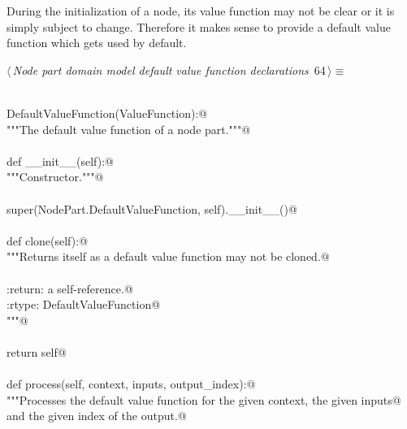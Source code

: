 \documentclass[
    a4paper,      %
    10pt,         %
    openright,    %
    notitlepage,  %
    parskip=half, %
]{scrreprt}       %
\theoremstyle{definition}                    %
\begin{document}
During the initialization of a node, its value function may not be clear or it
is simply subject to change. Therefore it makes sense to provide a default
value function which gets used by default.

\begin{flushleft} \small
\begin{minipage}{\linewidth}\label{scrap105}\raggedright\small
{} $\langle\,${\itshape Node part domain model default value function declarations}\nobreak\ {\footnotesize {64}}$\,\rangle\equiv$
\vspace{-1exm}
\begin{list}{}{} \item
\mbox{}\lstinline@@\\
\mbox{}\lstinline@class DefaultValueFunction(ValueFunction):@\\
\mbox{}\lstinline@    """The default value function of a node part."""@\\
\mbox{}\lstinline@@\\
\mbox{}\lstinline@    def __init__(self):@\\
\mbox{}\lstinline@        """Constructor."""@\\
\mbox{}\lstinline@@\\
\mbox{}\lstinline@        super(NodePart.DefaultValueFunction, self).__init__()@\\
\mbox{}\lstinline@@\\
\mbox{}\lstinline@    def clone(self):@\\
\mbox{}\lstinline@        """Returns itself as a default value function may not be cloned.@\\
\mbox{}\lstinline@@\\
\mbox{}\lstinline@        :return: a self-reference.@\\
\mbox{}\lstinline@        :rtype: DefaultValueFunction@\\
\mbox{}\lstinline@        """@\\
\mbox{}\lstinline@@\\
\mbox{}\lstinline@        return self@\\
\mbox{}\lstinline@@\\
\mbox{}\lstinline@    def process(self, context, inputs, output_index):@\\
\mbox{}\lstinline@        """Processes the default value function for the given context, the given inputs@\\
\mbox{}\lstinline@        and the given index of the output.@\\
\mbox{}\lstinline@@\\

\end{list}
\end{minipage}
\end{flushleft}
\end{document}
